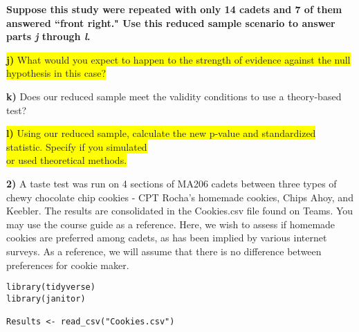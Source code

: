 \documentclass{article}
\newif\ifPrintSolution
\newcommand{\sol}[1]{\ifPrintSolution {\color{blue} #1 } \fi}
\begin{document}
\vspace{0.25in}

\textbf{Suppose this study were repeated with only 14 cadets and 7 of them answered ``front right." Use this reduced sample scenario to answer parts \textit{j} through \textit{l}.
}
\vspace{0.1in}

\hspace{0.1in} \colorbox{yellow}{\textbf{j) }What would you expect to happen to the strength of evidence against the null hypothesis in this case?}

\sol{We would expect weaker strength of evidence because the proportion stays the same but the sample size is smaller, so our p-value should be higher.}

\vspace{0.25in}

\hspace{0.1in} \textbf{k) } Does our reduced sample meet the validity conditions to use a theory-based test?

\sol{No, here we have 7 successes and 7 failures, both less than the 10 required}

\vspace{0.25in}

\hspace{0.1in} \colorbox{yellow}{\textbf{l)} Using our reduced sample, calculate the new p-value and standardized statistic. Specify if you simulated}\\ \colorbox{yellow}{or used theoretical methods.}


\sol{We do not meet validity conditions, so we must simulate.\\
Answers will vary, should be about \\
p-value = 0.0370\\
z = 2.21}

\pagebreak

\textbf{2) } A taste test was run on 4 sections of MA206 cadets between three types of chewy chocolate chip cookies - CPT Rocha's homemade cookies, Chips Ahoy, and Keebler. The results are consolidated in the \color{blue} Cookies.csv \color{black} file found on Teams. You may use the course guide as a reference. Here, we wish to assess if homemade cookies are preferred among cadets, as has been implied by various internet surveys. As a reference, we will assume that there is no difference between preferences for cookie maker.

\color{blue}
\begin{verbatim}
library(tidyverse)
library(janitor)

Results <- read_csv("Cookies.csv")
\end{verbatim}
\color{black}
\end{document}
